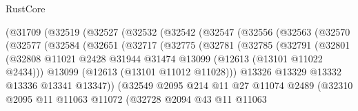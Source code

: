 \begin{lexlean}{RustCore}
\begin{coremodule}
                (@31709
                  (@32519
                    (@32527
                      (@32532
                        (@32542
                          (@32547
                            (@32556
                              (@32563
                                (@32570
                                  (@32577
                                    (@32584
                                      (@32651
                                        (@32717
                                          (@32775
                                            (@32781
                                              (@32785
                                                (@32791
                                                  (@32801
                                                    (@32808
                                                      @11021
                                                      @2428
                                                      @31944
                                                      @31474
                                                      @13099
                                                      (@12613 (@13101 @11022 @2434)))
                                                    @13099
                                                    (@12613 (@13101 @11012 @11028)))
                                                  @13326
                                                  @13329
                                                  @13332
                                                  @13336
                                                  @13341
                                                  @13347))
                                              (@32549
                                                @2095
                                                @214
                                                @11
                                                @27
                                                @11074
                                                @2489
                                                (@32310
                                                  @2095
                                                  @11
                                                  @11063
                                                  @11072
                                                  (@32728
                                                    @2094
                                                    @43
                                                    @11
                                                    @11063

\end{coremodule}
\end{lexlean}
